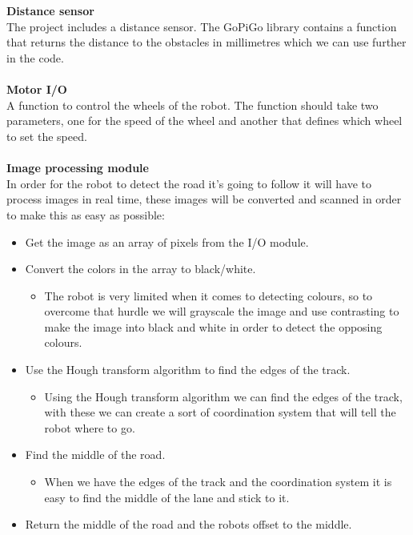 \documentclass[11pt]{article}
\begin{document}
\\\\
\textbf{Distance sensor}
\\ 
The project includes a distance sensor. The GoPiGo library contains a function that returns the distance to the obstacles in millimetres which we can use further in the code. 
\\\\
\textbf{Motor I/O}
\\
A function to control the wheels of the robot. The function should take two parameters, one for the speed of the wheel and another that defines which wheel to set the speed. 
\\\\
\textbf{Image processing module}
\\
In order for the robot to detect the road it’s going to follow it will have to process images in real time, these images will be converted and scanned in order to make this as easy as possible:
\begin{itemize}
    \item Get the image as an array of pixels from the I/O module. 
    \item Convert the colors in the array to black/white. \begin{itemize}
        \item The robot is very limited when it comes to detecting colours, so to overcome that hurdle we will grayscale the image and use contrasting to make the image into black and white in order to detect the opposing colours.
    \end{itemize}
    \item Use the Hough transform algorithm to find the edges of the track. \begin{itemize}
        \item Using the Hough transform algorithm we can find the edges of the track, with these we can create a sort of coordination system that will tell the robot where to go.
    \end{itemize}
    \item Find the middle of the road. \begin{itemize}
        \item When we have the edges of the track and the coordination system it is easy to find the middle of the lane and stick to it.
    \end{itemize}
    \item Return the middle of the road and the robots offset to the middle. 
\end{itemize}
\end{document}

